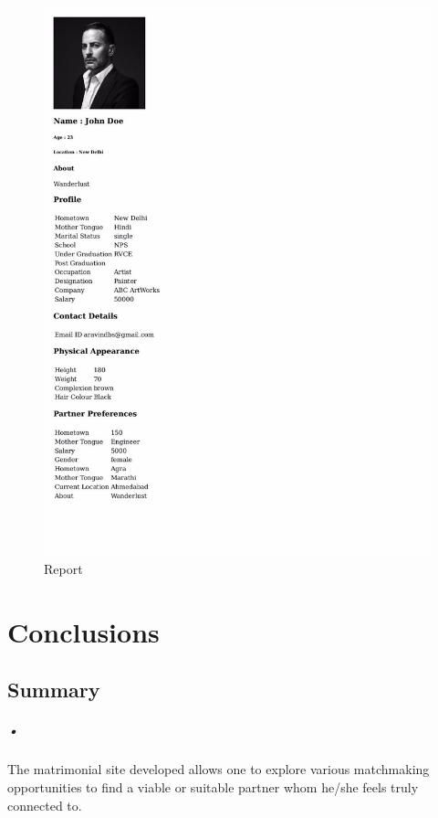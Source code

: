 \documentclass[12pt]{report}
\begin{document}
\begin{figure}[!htb]
    \centering
    \includegraphics[width=.9\textwidth]{report.jpeg}
    \caption{Report}
    \label{fig:Report}
\end{figure} 

\chapter{Conclusions}
\section{Summary}
\paragraph*{•}
 
 The matrimonial site developed allows one to explore various matchmaking opportunities to find a viable or suitable partner whom he/she feels truly connected to.\\
\end{document}

